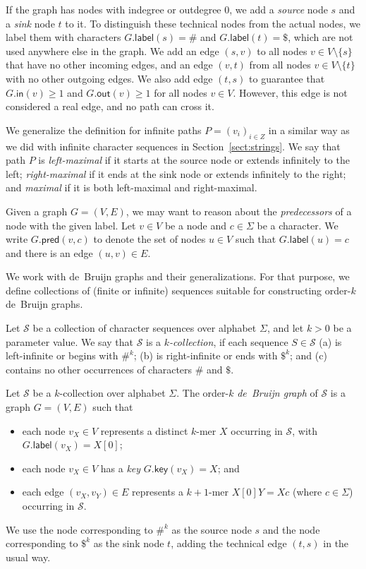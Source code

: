\documentclass[a4paper,11pt]{llncs}
\newcommand{\set}[1]{\ensuremath{\{ #1 \}}}
\newcommand{\gindegree}{\ensuremath{\mathsf{in}}}
\newcommand{\goutdegree}{\ensuremath{\mathsf{out}}}
\newcommand{\glabel}{\ensuremath{\mathsf{label}}}
\newcommand{\gpred}{\ensuremath{\mathsf{pred}}}
\newcommand{\gkey}{\ensuremath{\mathsf{key}}}
\newcommand{\kmer}[1]{$#1$\nobreakdash-mer}
\newcommand{\kcollection}[1]{$#1$\nobreakdash-collection}
\newcommand{\orderk}[1]{order\nobreakdash-$#1$}
\begin{document}
If the graph has nodes with indegree or outdegree $0$, we add a \emph{source} node $s$ and a \emph{sink} node $t$ to it. To distinguish these technical nodes from the actual nodes, we label them with characters $G.\glabel(s) = \#$ and $G.\glabel(t) = \$$, which are not used anywhere else in the graph. We add an edge $(s, v)$ to all nodes $v \in V \setminus \set{s}$ that have no other incoming edges, and an edge $(v, t)$ from all nodes $v \in V \setminus \set{t}$ with no other outgoing edges. We also add edge $(t, s)$ to guarantee that $G.\gindegree(v) \ge 1$ and $G.\goutdegree(v) \ge 1$ for all nodes $v \in V$. However, this edge is not considered a real edge, and no path can cross it.

We generalize the definition for infinite paths $P = (v_{i})_{i \in Z}$ in a similar way as we did with infinite character sequences in Section~\ref{sect:strings}. We say that path $P$ is \emph{left-maximal} if it starts at the source node or extends infinitely to the left; \emph{right-maximal} if it ends at the sink node or extends infinitely to the right; and \emph{maximal} if it is both left-maximal and right-maximal.

Given a graph $G = (V, E)$, we may want to reason about the \emph{predecessors} of a node with the given label. Let $v \in V$ be a node and $c \in \Sigma$ be a character. We write $G.\gpred(v, c)$ to denote the set of nodes $u \in V$ such that $G.\glabel(u) = c$ and there is an edge $(u, v) \in E$.

We work with de~Bruijn graphs and their generalizations. For that purpose, we define collections of (finite or infinite) sequences suitable for constructing \orderk{k} de~Bruijn graphs.

\begin{definition}[\kcollection{k}]
Let $\mathcal{S}$ be a collection of character sequences over alphabet $\Sigma$, and let $k > 0$ be a parameter value. We say that $\mathcal{S}$ is a \emph{\kcollection{k}}, if each sequence $S \in \mathcal{S}$
(a) is left-infinite or begins with $\#^{k}$;
(b) is right-infinite or ends with $\$^{k}$; and
(c) contains no other occurrences of characters $\#$ and $\$$.
\end{definition}

\begin{definition}
Let $\mathcal{S}$ be a \kcollection{k} over alphabet $\Sigma$. The \orderk{k} \emph{de~Bruijn graph} of $\mathcal{S}$ is a graph $G = (V, E)$ such that
\begin{itemize}
\item each node $v_{X} \in V$ represents a distinct \kmer{k} $X$ occurring in $\mathcal{S}$, with $G.\glabel(v_{X}) = X[0]$;
\item each node $v_{X} \in V$ has a \emph{key} $G.\gkey(v_{X}) = X$; and
\item each edge $(v_{X}, v_{Y}) \in E$ represents a \kmer{k+1} $X[0]Y = Xc$ (where $c \in \Sigma$) occurring in $\mathcal{S}$.
\end{itemize}
We use the node corresponding to $\#^{k}$ as the source node $s$ and the node corresponding to $\$^{k}$ as the sink node $t$, adding the technical edge $(t, s)$ in the usual way.
\end{definition}
\end{document}
